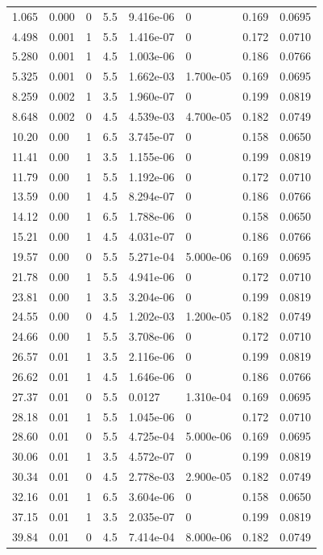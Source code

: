 \documentclass[preview]{standalone}
\begin{document}
{{\begin{tabular}{L{1.2cm}C{1.2cm} C{0.3cm}C{0.5cm} C{1.4cm}C{1.4cm} C{1.4cm}C{1.4cm}}
  1.065  &  0.000  & 0     & 5.5 &  9.416e-06  & 0  & 0.169 &  0.0695   \\ 
  4.498  &  0.001  & 1     & 5.5 &  1.416e-07  & 0  & 0.172 &  0.0710   \\ 
  5.280  &  0.001  & 1     & 4.5 &  1.003e-06  & 0  & 0.186 &  0.0766   \\ 
  5.325  &  0.001  & 0     & 5.5 &  1.662e-03  & 1.700e-05  & 0.169 &  0.0695   \\ 
  8.259  &  0.002  & 1     & 3.5 &  1.960e-07  & 0  & 0.199 &  0.0819   \\ 
  8.648  &  0.002  & 0     & 4.5 &  4.539e-03  & 4.700e-05  & 0.182 &  0.0749   \\ 
  10.20  &  0.00  & 1     & 6.5 &  3.745e-07  & 0  & 0.158 &  0.0650   \\ 
  11.41  &  0.00  & 1     & 3.5 &  1.155e-06  & 0  & 0.199 &  0.0819   \\ 
  11.79  &  0.00  & 1     & 5.5 &  1.192e-06  & 0  & 0.172 &  0.0710   \\ 
  13.59  &  0.00  & 1     & 4.5 &  8.294e-07  & 0  & 0.186 &  0.0766   \\ 
  14.12  &  0.00  & 1     & 6.5 &  1.788e-06  & 0  & 0.158 &  0.0650   \\ 
  15.21  &  0.00  & 1     & 4.5 &  4.031e-07  & 0  & 0.186 &  0.0766   \\ 
  19.57  &  0.00  & 0     & 5.5 &  5.271e-04  & 5.000e-06  & 0.169 &  0.0695   \\ 
  21.78  &  0.00  & 1     & 5.5 &  4.941e-06  & 0  & 0.172 &  0.0710   \\ 
  23.81  &  0.00  & 1     & 3.5 &  3.204e-06  & 0  & 0.199 &  0.0819   \\ 
  24.55  &  0.00  & 0     & 4.5 &  1.202e-03  & 1.200e-05  & 0.182 &  0.0749   \\ 
  24.66  &  0.00  & 1     & 5.5 &  3.708e-06  & 0  & 0.172 &  0.0710   \\ 
  26.57  &  0.01  & 1     & 3.5 &  2.116e-06  & 0  & 0.199 &  0.0819   \\ 
  26.62  &  0.01  & 1     & 4.5 &  1.646e-06  & 0  & 0.186 &  0.0766   \\ 
  27.37  &  0.01  & 0     & 5.5 &  0.0127  & 1.310e-04  & 0.169 &  0.0695   \\ 
  28.18  &  0.01  & 1     & 5.5 &  1.045e-06  & 0  & 0.172 &  0.0710   \\ 
  28.60  &  0.01  & 0     & 5.5 &  4.725e-04  & 5.000e-06  & 0.169 &  0.0695   \\ 
  30.06  &  0.01  & 1     & 3.5 &  4.572e-07  & 0  & 0.199 &  0.0819   \\ 
  30.34  &  0.01  & 0     & 4.5 &  2.778e-03  & 2.900e-05  & 0.182 &  0.0749   \\ 
  32.16  &  0.01  & 1     & 6.5 &  3.604e-06  & 0  & 0.158 &  0.0650   \\ 
  37.15  &  0.01  & 1     & 3.5 &  2.035e-07  & 0  & 0.199 &  0.0819   \\ 
  39.84  &  0.01  & 0     & 4.5 &  7.414e-04  & 8.000e-06  & 0.182 &  0.0749   \\ 
\hline 
\end{tabular} 

}}
\end{document}

